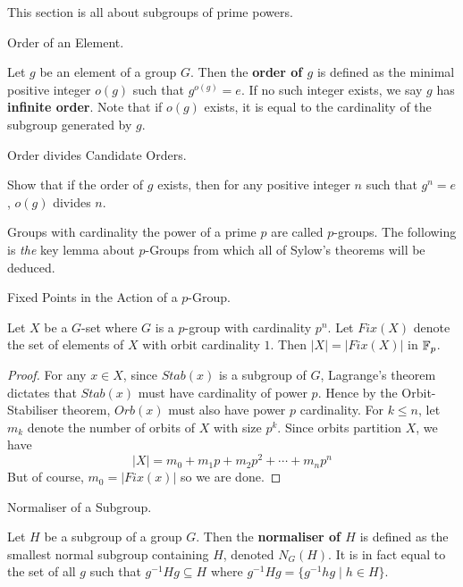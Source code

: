\documentclass[../../book.tex]{subfiles}
\begin{document}
This section is all about subgroups of prime powers. 

\begin{dfn} Order of an Element.
    
    Let $g$ be an element of a group $G$. 
    Then the \textbf{order of $g$} is defined as 
    the minimal positive integer $o(g)$ such that $g^{o(g)} = e$. 
    If no such integer exists, we say $g$ has \textbf{infinite order}. 
    Note that if $o(g)$ exists, 
    it is equal to the cardinality of the subgroup generated by $g$.
    
\end{dfn}
\begin{ex} Order divides Candidate Orders.
    
    Show that if the order of $g$ exists, then
    for any positive integer $n$ such that $g^n = e$, 
    $o(g)$ divides $n$. 
    
\end{ex}

Groups with cardinality the power of a prime $p$ are called $p$-groups. 
The following is \emph{the} key lemma about $p$-Groups 
from which all of Sylow's theorems will be deduced. 

\begin{dfn} Fixed Points in the Action of a $p$-Group. 
    
    Let $X$ be a $G$-set where $G$ is a $p$-group with cardinality $p^n$.
    Let $Fix(X)$ denote the set of elements of $X$ with orbit cardinality $1$. 
    Then $|X| = |Fix(X)|$ in $\mathbb{F}_p$. 
    
\end{dfn}
\begin{proof}
    
    For any $x \in X$, since $Stab(x)$ is a subgroup of $G$, 
    Lagrange's theorem dictates that $Stab(x)$ must have cardinality of power $p$.
    Hence by the Orbit-Stabiliser theorem, 
    $Orb(x)$ must also have power $p$ cardinality. 
    For $k \leq n$, let $m_k$ denote the number of orbits of $X$ with size $p^k$. 
    Since orbits partition $X$, we have \[
        |X| = m_0 + m_1 p + m_2 p^2 + \cdots + m_n p^n
    \]
    But of course, $m_0 = |Fix(x)|$ so we are done. 
\end{proof}

\begin{dfn} Normaliser of a Subgroup. 
    
    Let $H$ be a subgroup of a group $G$. 
    Then the \textbf{normaliser of $H$} is defined as the smallest normal subgroup
    containing $H$, denoted $N_G(H)$. 
    It is in fact equal to the set of all $g$ such that $g^{-1}Hg \subseteq H$
    where $g^{-1} H g = \{ g^{-1}hg \mid h \in H \}$. 
    
\end{dfn}
\end{document}
